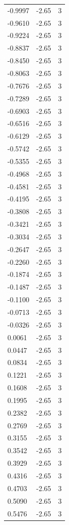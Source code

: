 \begin{longtable}{lrr}
  -0.9997 & -2.65 & 3 \\
  -0.9610 & -2.65 & 3 \\
  -0.9224 & -2.65 & 3 \\
  -0.8837 & -2.65 & 3 \\
  -0.8450 & -2.65 & 3 \\
  -0.8063 & -2.65 & 3 \\
  -0.7676 & -2.65 & 3 \\
  -0.7289 & -2.65 & 3 \\
  -0.6903 & -2.65 & 3 \\
  -0.6516 & -2.65 & 3 \\
  -0.6129 & -2.65 & 3 \\
  -0.5742 & -2.65 & 3 \\
  -0.5355 & -2.65 & 3 \\
  -0.4968 & -2.65 & 3 \\
  -0.4581 & -2.65 & 3 \\
  -0.4195 & -2.65 & 3 \\
  -0.3808 & -2.65 & 3 \\
  -0.3421 & -2.65 & 3 \\
  -0.3034 & -2.65 & 3 \\
  -0.2647 & -2.65 & 3 \\
  -0.2260 & -2.65 & 3 \\
  -0.1874 & -2.65 & 3 \\
  -0.1487 & -2.65 & 3 \\
  -0.1100 & -2.65 & 3 \\
  -0.0713 & -2.65 & 3 \\
  -0.0326 & -2.65 & 3 \\
  0.0061 & -2.65 & 3 \\
  0.0447 & -2.65 & 3 \\
  0.0834 & -2.65 & 3 \\
  0.1221 & -2.65 & 3 \\
  0.1608 & -2.65 & 3 \\
  0.1995 & -2.65 & 3 \\
  0.2382 & -2.65 & 3 \\
  0.2769 & -2.65 & 3 \\
  0.3155 & -2.65 & 3 \\
  0.3542 & -2.65 & 3 \\
  0.3929 & -2.65 & 3 \\
  0.4316 & -2.65 & 3 \\
  0.4703 & -2.65 & 3 \\
  0.5090 & -2.65 & 3 \\
  0.5476 & -2.65 & 3 \\

\end{longtable}
